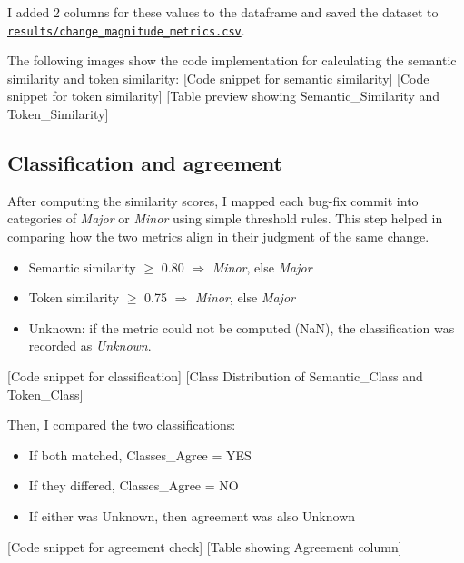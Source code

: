 \documentclass[10pt,a4paper]{report}
\begin{document}
I added 2 columns for these values to the dataframe and saved the dataset to \href{https://github.com/ShardulJunagade/cs202-stt/blob/main/lab3/results/change_magnitude_metrics.csv}{\texttt{results/change\_magnitude\_metrics.csv}}.

The following images show the code implementation for calculating the semantic similarity and token similarity:
[Code snippet for semantic similarity]
[Code snippet for token similarity]
[Table preview showing Semantic\_Similarity and Token\_Similarity]

\subsection{Classification and agreement}
After computing the similarity scores, I mapped each bug-fix commit into categories of \textit{Major} or \textit{Minor} using simple threshold rules. 
This step helped in comparing how the two metrics align in their judgment of the same change.
\begin{itemize}[itemsep=0.05em, topsep=0pt]
    \item Semantic similarity $\geq$ 0.80 $\Rightarrow$ \textit{Minor}, else \textit{Major}
    \item Token similarity $\geq$ 0.75 $\Rightarrow$ \textit{Minor}, else \textit{Major}
    \item Unknown: if the metric could not be computed (NaN), the classification was recorded as \textit{Unknown}.
\end{itemize}

[Code snippet for classification]
[Class Distribution of Semantic\_Class and Token\_Class]

Then, I compared the two classifications:
\begin{itemize}[itemsep=0.05em, topsep=0pt]
    \item If both matched, Classes\_Agree = YES
    \item If they differed, Classes\_Agree = NO
    \item If either was Unknown, then agreement was also Unknown
\end{itemize}

[Code snippet for agreement check]
[Table showing Agreement column]
\end{document}

